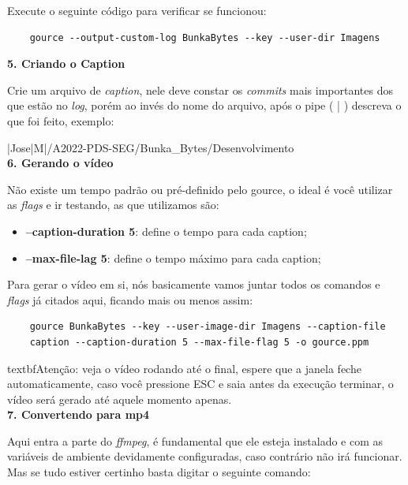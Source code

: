 Execute o seguinte código para verificar se funcionou:

\lstset{language=Fortran,
             basicstyle=\ttfamily\small,
             showstringspaces=false
    }
        \begin{lstlisting} 
    gource --output-custom-log BunkaBytes --key --user-dir Imagens
        \end{lstlisting}

\textbf{5. Criando o Caption}

Crie um arquivo de \textit{caption}, nele deve constar os \textit{commits} mais importantes dos que estão no \textit{log}, porém ao invés do nome do arquivo, após o pipe ( | ) descreva o que foi feito, exemplo:

|Jose|M|/A2022-PDS-SEG/Bunka\_Bytes/Desenvolvimento \\

\textbf{6. Gerando o vídeo}

Não existe um tempo padrão ou pré-definido pelo \gls{gource}, o ideal é você utilizar as \textit{flags} e ir testando, as que utilizamos são:

\begin{itemize}
    \item \textbf{--caption-duration 5}: define o tempo para cada caption;
    \item \textbf{--max-file-lag 5}: define o tempo máximo para cada caption; 
\end{itemize}

Para gerar o vídeo em si, nós basicamente vamos juntar todos os comandos e \textit{flags} já citados aqui, ficando mais ou menos assim:

\lstset{language=Fortran,
             basicstyle=\ttfamily\small,
             showstringspaces=false
    }
        \begin{lstlisting} 
    gource BunkaBytes --key --user-image-dir Imagens --caption-file 
    caption --caption-duration 5 --max-file-flag 5 -o gource.ppm 
        \end{lstlisting}
  
textbf{Atenção:}  veja o vídeo rodando até o final, espere que a janela feche automaticamente, caso você pressione ESC e saia antes da execução terminar, o vídeo será gerado até aquele momento apenas.\\

\textbf{7. Convertendo para mp4}

Aqui entra a parte do \textit{ffmpeg}, é fundamental que ele esteja instalado e com as variáveis de ambiente devidamente configuradas, caso contrário não irá funcionar. Mas se tudo estiver certinho basta digitar o seguinte comando:

